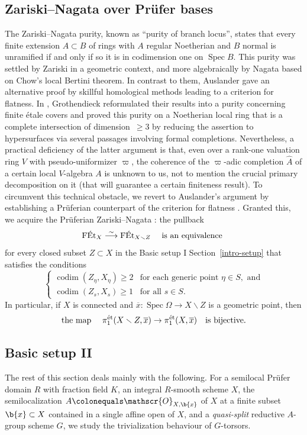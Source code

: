 \documentclass[JEP,XML,SOM,Unicode,published]{cedram}
\let\backslash\smallsetminus
\newcommand{\sO}{\mathscr{O}}
\let\wh\widehat
\let\ov\overline
\let\ce\colonequals
\let\q\quad
\newcommand{\isoto}{\overset{\sim}{\longrightarrow}}
\newcommand{\et}{\textup{ét}}
\DeclareMathOperator{\Spec}{Spec}
\DeclareMathOperator{\codim}{codim}
\theoremstyle{plain}
\theoremstyle{definition}
\begin{document}
\subsection{Zariski--Nagata over Prüfer bases}\label{par-Zariski--Nagata over Prüfer bases}
The Zariski--Nagata purity, known as ``purity of branch locus'', states that every finite extension $A\subset B$ of rings with $A$ regular Noetherian and $B$ normal is unramified if and only if so it is in codimension one on $\Spec B$.
This purity was settled by Zariski \cite{Zar58} in a geometric context, and more algebraically by Nagata \cite{Nag59} based on Chow's local Bertini theorem.
In contrast to them, Auslander gave an alternative proof \cite[Th.\,1.4]{Aus62} by skillful homological methods leading to a criterion for flatness.
In \cite[Exp.\,X, \S3]{SGA2new}, Grothendieck reformulated their results into a purity concerning finite étale covers and proved this purity on {a Noetherian local ring} that is a complete intersection of dimension~\hbox{$\geq 3$} by reducing the assertion to hypersurfaces via several passages involving formal completions.
Nevertheless, a practical deficiency of the {latter} argument is that, even over a rank-one valuation ring $V$ with pseudo-uniformizer $\varpi$, the coherence of the $\varpi$-adic completion $\wh{A}$ of a certain local $V$-algebra $A$ is unknown to us, not to mention the crucial primary decomposition on it (that will guarantee a certain finiteness result).
To circumvent this technical obstacle, we revert to Auslander's argument by establishing a Prüferian counterpart  of the criterion for flatness \cite[Th.\,1.3]{Aus62}.
Granted this, we acquire the Prüferian Zariski--Nagata : the pullback
\[
\text{$\textup{FÉt}_X\isoto \textup{FÉt}_{X\backslash Z}$ \q is an equivalence }
\]
for every closed subset $Z\subset X$ in the Basic setup I Section~\ref{intro-setup} that satisfies the conditions
\[
\begin{cases}
\codim(Z_{\eta}, X_{\eta})\geq 2 & \text{for each generic point } \eta\in S, \text{ and} \\
\codim(Z_s,X_s)\geq 1 & \text{for all } s\in S.
\end{cases}
\]
In particular, if $X$ is connected and $\ov{x}\colon \Spec \Omega\to X\backslash Z $ is a geometric point, then
\[
\text{the map \q $\pi_1^{\et}(X\backslash Z, \ov{x})\to \pi_1^{\et}(X,\ov{x})$\q is bijective.}
\]

\subsection{Basic setup II}\label{intro basic setup ii}
The rest of this section deals mainly with the following.
For a semilocal Prüfer domain $R$ with fraction field $K$, an integral $R$-smooth scheme $X$, the semilocalization $A\ce \sO_{X,\b{x}}$ of $X$ at a finite subset $\b{x}\subset X$ contained in a single affine open of $X$, and a \emph{quasi-split} reductive $A$-group scheme $G$, we study the trivialization behaviour of $G$-torsors.
\end{document}
